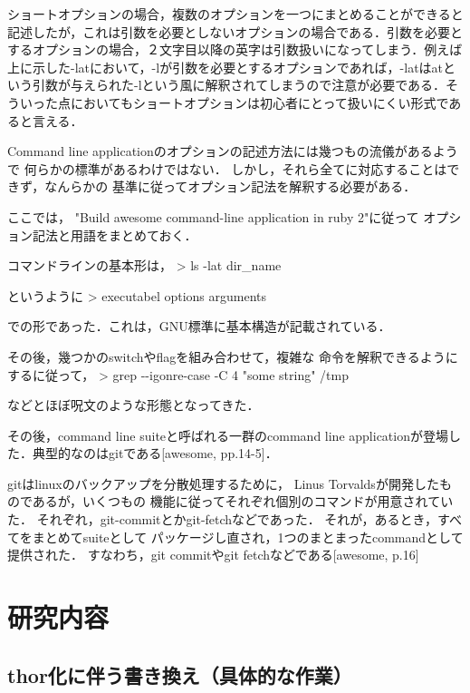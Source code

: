 \documentclass[11pt,dvipdfmx]{jsarticle}
\begin{document}
ショートオプションの場合，複数のオプションを一つにまとめることができると記述したが，これは引数を必要としないオプションの場合である．引数を必要とするオプションの場合，２文字目以降の英字は引数扱いになってしまう．例えば上に示した-latにおいて，-lが引数を必要とするオプションであれば，-latはatという引数が与えられた-lという風に解釈されてしまうので注意が必要である．そういった点においてもショートオプションは初心者にとって扱いにくい形式であると言える．

Command line
applicationのオプションの記述方法には幾つもの流儀があるようで
何らかの標準があるわけではない．
しかし，それら全てに対応することはできず，なんらかの
基準に従ってオプション記法を解釈する必要がある．

ここでは， "Build awesome command-line application in ruby 2"に従って
オプション記法と用語をまとめておく．

コマンドラインの基本形は， \textgreater{} ls -lat dir\_name

というように \textgreater{} executabel options arguments

での形であった．これは，GNU標準に基本構造が記載されている．

その後，幾つかのswitchやflagを組み合わせて，複雑な
命令を解釈できるようにするに従って， \textgreater{} grep -\/-igonre-case
-C 4 "some string" /tmp

などとほぼ呪文のような形態となってきた．

その後，command line suiteと呼ばれる一群のcommand line
applicationが登場した．典型的なのはgitである{[}awesome, pp.14-5{]}．

gitはlinuxのバックアップを分散処理するために， Linus
Torvaldsが開発したものであるが，いくつもの
機能に従ってそれぞれ個別のコマンドが用意されていた．
それぞれ，git-commitとかgit-fetchなどであった．
それが，あるとき，すべてをまとめてsuiteとして
パッケージし直され，1つのまとまったcommandとして提供された．
すなわち，git commitやgit fetchなどである{[}awesome, p.16{]}

    \section{研究内容}\label{ux7814ux7a76ux5185ux5bb9}

    \subsection{thor化に伴う書き換え（具体的な作業）}\label{thorux5316ux306bux4f34ux3046ux66f8ux304dux63dbux3048ux5177ux4f53ux7684ux306aux4f5cux696d}
\end{document}
